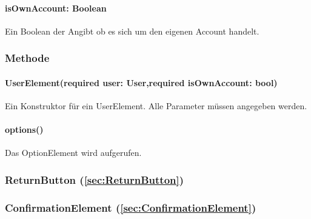\documentclass[parskip=full]{scrartcl}
\begin{document}
\paragraph*{isOwnAccount: Boolean} Ein Boolean der Angibt ob es sich um den eigenen Account handelt.

\subsubsection*{Methode}
\paragraph*{UserElement(required user: User,required isOwnAccount: bool)} Ein Konstruktor für ein UserElement. Alle Parameter müssen angegeben werden.
\paragraph*{options()} Das OptionElement wird aufgerufen.

\subsubsection*{ReturnButton (\ref{sec:ReturnButton})}

\subsubsection*{ConfirmationElement (\ref{sec:ConfirmationElement})}
\end{document}
